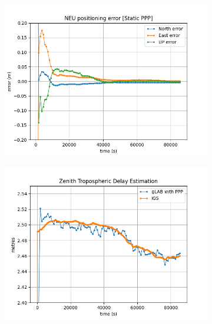 \begin{figure}[H]
    \centering
    \begin{subfigure}{0.45\textwidth}
        \centering
        \includegraphics[scale=0.52]{sources/Figures/FIG_2/TUT2_Ex1a.png}
        \caption{}
        \label{fig:subfig1}
    \end{subfigure}
    \hfill
    \begin{subfigure}{0.45\textwidth}
        \centering
        \includegraphics[scale=0.52]{sources/Figures/FIG_2/TUT2_Ex1b.png}
        \caption{}
        \label{fig:subfig2}
    \end{subfigure}
    \caption{}
    \label{fig:dos-figuras-juntas}
\end{figure}